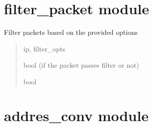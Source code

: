 \documentclass[letterpaper,10pt,english]{sphinxmanual}
\begin{document}
\sphinxstepscope


\chapter{filter\_packet module}
\label{\detokenize{modules/filter_packet:module-filter_packet}}\label{\detokenize{modules/filter_packet:filter-packet-module}}\label{\detokenize{modules/filter_packet::doc}}

\begin{fulllineitems}
\label{\detokenize{modules/filter_packet:filter_packet.filter_packet}}
\pysigstartsignatures
\pysiglinewithargsret
{}
{\sphinxparamcomma {}}
{}
\pysigstopsignatures
\sphinxAtStartPar
Filter packets based on the provided options
\begin{quote}\begin{description}
\sphinxAtStartPar
{} \textendash{} ip, filter\_opts

\sphinxAtStartPar
bool (if the packet passes filter or not)

\sphinxAtStartPar
bool

\end{description}\end{quote}

\end{fulllineitems}


\sphinxstepscope


\chapter{addres\_conv module}
\label{\detokenize{modules/addres_conv:module-addres_conv}}\label{\detokenize{modules/addres_conv:addres-conv-module}}\label{\detokenize{modules/addres_conv::doc}}
\end{document}
